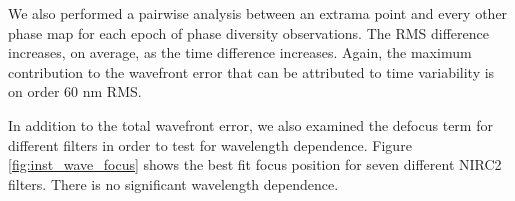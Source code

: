 
We also performed a pairwise analysis between an extrama point and every other phase map for each epoch of phase diversity observations. The RMS difference increases, on average, as the  time difference increases. Again, the maximum contribution to the wavefront error that can be attributed to time variability is on order 60 nm RMS.

In addition to the total wavefront error, we also examined the defocus term for different filters in order to test for wavelength dependence. Figure \ref{fig:inst_wave_focus} shows the best fit focus position for seven different NIRC2 filters. There is no significant 
wavelength dependence. 

